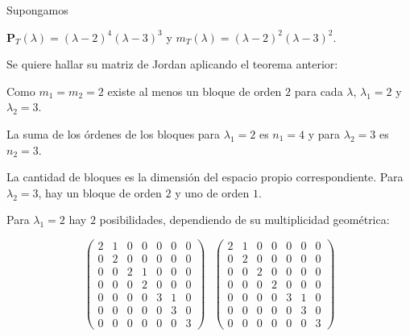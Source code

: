 \bigskip

\begin{example}



Supongamos 

\bigskip

$\mathbf{P}_T(\lambda)=(\lambda-2)^{4} (\lambda-3)^{3}$  y $m_T(\lambda)=(\lambda-2)^{2} (\lambda-3)^{2}$.

\bigskip


Se quiere hallar su matriz de Jordan aplicando el teorema anterior:

\bigskip

\bigskip

Como $m_1=m_2=2$ existe al menos un bloque de orden $2$ para cada $\lambda$,  $\lambda_1=2$ y  $\lambda_2=3$.

\bigskip

La suma de los órdenes de los bloques para  $\lambda_1=2$ es $n_1=4$ y para $\lambda_2=3$  es $n_2=3$.

\bigskip

La cantidad de bloques es la dimensión del espacio propio correspondiente. Para $\lambda_2=3$, hay un bloque de orden $2$ y uno de orden $1$.

\bigskip

Para $\lambda_1=2$ hay $2$ posibilidades, dependiendo de su multiplicidad geométrica:

\bigskip

$$\left(\begin{array}{ccccccc} 2 & 1 &  0 & 0  & 0 &  0 & 0 \\ 0   & 2 & 0 & 0 & 0 &  0 & 0 
\\  0 & 0 &  2  & 1 & 0 &  0 & 0 \\ 0 & 0 & 0 & 2 & 0 &  0 & 0 \\  0 & 0 & 0 & 0 & 3 &  1 & 0 \\  0 & 0 & 0 & 0 & 0 &  3 & 0 \\  0 & 0 & 0 & 0 & 0 &  0 & 3 
\end{array}
 \right)~~~\left(\begin{array}{ccccccc} 2 & 1 &  0 & 0  & 0 &  0 & 0 \\ 0   & 2 & 0 & 0 & 0 &  0 & 0 
\\  0 & 0 &  2  & 0 & 0 &  0 & 0 \\ 0 & 0 & 0 & 2 & 0 &  0 & 0 \\  0 & 0 & 0 & 0 & 3 &  1 & 0 \\  0 & 0 & 0 & 0 & 0 &  3 & 0 \\  0 & 0 & 0 & 0 & 0 &  0 & 3 
\end{array}
 \right)$$




\end{example}
